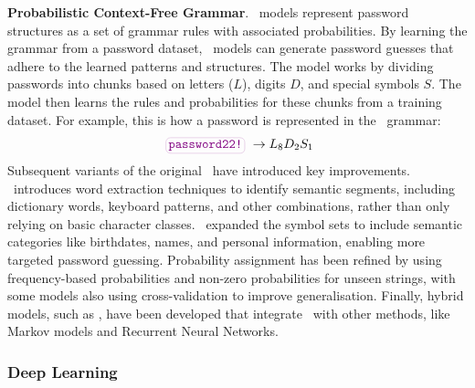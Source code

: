
\textbf{Probabilistic Context-Free Grammar}. \pcfg\ models represent password structures as a set of grammar rules with associated probabilities. By learning the grammar from a password dataset, \pcfgnocite\ models can generate password guesses that adhere to the learned patterns and structures. The model works by dividing passwords into chunks based on letters ($L$), digits $D$, and special symbols $S$. The model then learns the rules and probabilities for these chunks from a training dataset. For example, this is how a password is represented in the \pcfgnocite\ grammar:
\[
\text{\password{password22!}} \rightarrow L_8D_2S_1
\]
Subsequent variants of the original \pcfg\ have introduced key improvements. \wordpcfg\ introduces word extraction techniques to identify semantic segments, including dictionary words, keyboard patterns, and other combinations, rather than only relying on basic character classes. \personalpcfg\ expanded the symbol sets to include semantic categories like birthdates, names, and personal information, enabling more targeted password guessing. Probability assignment has been refined by using frequency-based probabilities and non-zero probabilities for unseen strings, with some models also using cross-validation to improve generalisation. Finally, hybrid models, such as \passtcn, have been developed that integrate \pcfgnocite\ with other methods, like Markov models and Recurrent Neural Networks.

\vspace{-0.25cm}
\subsubsection{Deep Learning}

